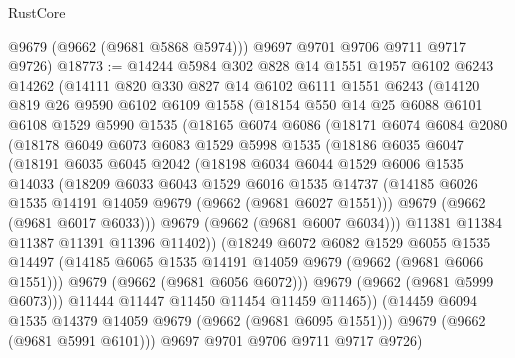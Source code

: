 \begin{lexlean}{RustCore}
\begin{coremodule}
        @9679
        (@9662 (@9681 @5868 @5974)))
      @9697
      @9701
      @9706
      @9711
      @9717
      @9726)
@18773 := @14244
    @5984
    @302
    @828
    @14
    @1551
    @1957
    @6102
    @6243
    @14262
    (@14111
      @820
      @330
      @827
      @14
      @6102
      @6111
      @1551
      @6243
      (@14120
        @819
        @26
        @9590
        @6102
        @6109
        @1558
        (@18154
          @550
          @14
          @25
          @6088
          @6101
          @6108
          @1529
          @5990
          @1535
          (@18165
            @6074
            @6086
            (@18171
              @6074
              @6084
              @2080
              (@18178
                @6049
                @6073
                @6083
                @1529
                @5998
                @1535
                (@18186
                  @6035
                  @6047
                  (@18191
                    @6035
                    @6045
                    @2042
                    (@18198
                      @6034
                      @6044
                      @1529
                      @6006
                      @1535
                      @14033
                      (@18209
                        @6033
                        @6043
                        @1529
                        @6016
                        @1535
                        @14737
                        (@14185 @6026 @1535 @14191 @14059 @9679 (@9662 (@9681 @6027 @1551)))
                        @9679
                        (@9662 (@9681 @6017 @6033)))
                      @9679
                      (@9662 (@9681 @6007 @6034)))
                    @11381
                    @11384
                    @11387
                    @11391
                    @11396
                    @11402))
                (@18249
                  @6072
                  @6082
                  @1529
                  @6055
                  @1535
                  @14497
                  (@14185 @6065 @1535 @14191 @14059 @9679 (@9662 (@9681 @6066 @1551)))
                  @9679
                  (@9662 (@9681 @6056 @6072)))
                @9679
                (@9662 (@9681 @5999 @6073)))
              @11444
              @11447
              @11450
              @11454
              @11459
              @11465))
          (@14459 @6094 @1535 @14379 @14059 @9679 (@9662 (@9681 @6095 @1551)))
          @9679
          (@9662 (@9681 @5991 @6101)))
        @9697
        @9701
        @9706
        @9711
        @9717
        @9726)

\end{coremodule}
\end{lexlean}
